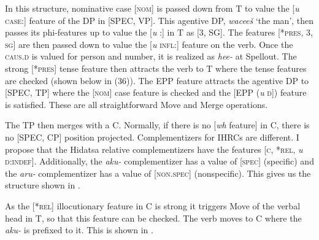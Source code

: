 \documentclass[output=paper]{LSP/langsci}
\begin{document}
In this structure, nominative case [\textsc{nom}] is passed down from T to value the [\textit{u} \textsc{case}:] feature of the DP in [SPEC, VP]. This agentive DP, \textit{wacee\v{s}} `the man', then passes its phi-features up to value the [\textit{u} :] in T as [3, SG].  The features [*\textsc{pres, 3, sg}] are then passed down to value the [\textit{u} \textsc{infl}:] feature on the verb. Once the \textsc{caus.d} is valued for person and number, it is realized as \textit{hee-} at Spellout. The strong [*\textsc{pres}] tense feature then attracts the verb to T where the tense features are checked (shown below in (36)). The EPP feature attracts the agentive DP to [SPEC, TP] where the [\textsc{nom}] case feature is checked and the [EPP (\textit{u} \textsc{d}]) feature is satisfied. These are all straightforward Move and Merge operations.
	
The TP then merges with a C. Normally, if there is no [\textit{wh} feature] in C, there is no [SPEC, CP] position projected. Complementizers for IHRCs are different.  I propose that the Hidatsa relative complementizers have the features [\textsc{c, *rel,} \textit{u} \textsc{d:indef}].  Additionally, the \textit{aku-} complementizer has a value of [\textsc{spec}] (specific) and the \textit{aru-} complementizer has a value of [\textsc{non.spec}] (nonspecific). This gives us the structure shown in .

\ea \label{boyle36}
{\hspace{1em}}\newline

\z

As the [*\textsc{rel}] illocutionary feature in C is strong it triggers Move of the verbal head in T, so that this feature can be checked. The verb moves to C where the \textit{aku-} is prefixed to it. This is shown in .
\end{document}

